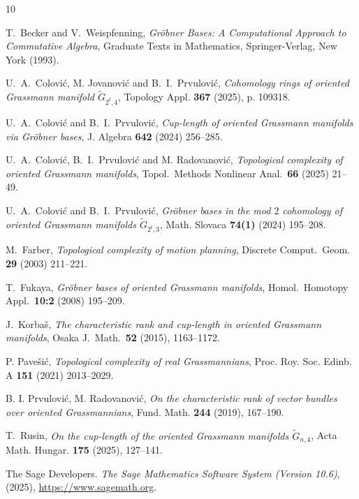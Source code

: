 \documentclass{amsart}
\theoremstyle{definition}
\theoremstyle{remark}
\numberwithin{equation}{section}
\newcommand{\gr}{\widetilde G}
\begin{document}

\begin{thebibliography}{10}




{T.\ Becker and V.\ Weispfenning}, \textit{Gr\"obner Bases: A Computational Approach to Commutative
Algebra}, Graduate Texts in Mathematics, Springer-Verlag, New York (1993).



{U.\ A.\ Colovi\'c, M. Jovanovi\' c and B.\ I.\ Prvulovi\'c,} {\it Cohomology rings of oriented Grassmann manifold $\gr_{2^t,4}$}, Topology Appl.  {\bf 367} (2025), p. 109318.



{U.\ A.\ Colovi\'c and B.\ I.\ Prvulovi\'c,} {\it Cup-length of oriented Grassmann manifolds via Gr\"obner bases}, J. Algebra {\bf 642} (2024) 256–285.


{U.\ A.\ Colovi\'c,  B.\ I.\ Prvulovi\'c and M. Radovanovi\' c,} {\it Topological complexity of oriented Grassmann manifolds}, Topol.\ Methods Nonlinear Anal.\ {\bf 66} (2025) 21--49.




{U.\ A.\ Colovi\'c and B.\ I.\ Prvulovi\'c,} {\it Gr\"obner bases in the mod $2$ cohomology of oriented Grassmann manifolds $\widetilde G_{2^t,3}$}, Math. Slovaca {\bf 74(1)} (2024) 195–208.

{ M.\ Farber}, {\it Topological complexity of motion planning}, {Discrete Comput.\ Geom.} {\bf 29} (2003) 211--221.

{ T.\ Fukaya}, \textit{Gr\"obner bases of oriented Grassmann manifolds}, Homol.\ Homotopy Appl.\ {\bf 10:2} (2008) 195--209.

{J.\ Korba\v s}, \textit{The characteristic rank and cup-length in oriented Grassmann manifolds}, Osaka J.\ Math.\  {\bf 52} (2015), 1163--1172.


{P. Pave\v si\' c}, \textit{Topological complexity of real Grassmannians}, Proc. Roy. Soc. Edinb. A {\bf 151} (2021) 2013–2029.


{B. I. Prvulovi\' c, M. Radovanovi\' c,} \textit{On the characteristic rank of vector bundles over oriented Grassmannians}, {Fund. Math.} {\bf 244} (2019), 167--190.


{T.\ Rusin,} {\it On the cup-length of the oriented Grassmann manifolds \(\widetilde G_{n,4}\)}, Acta Math. Hungar. \textbf{175} (2025), 127–141. 


{The Sage Developers.} {\it The Sage Mathematics Software System (Version 10.6)}, (2025), \url{https://www.sagemath.org}.



\end{thebibliography}
\end{document}
